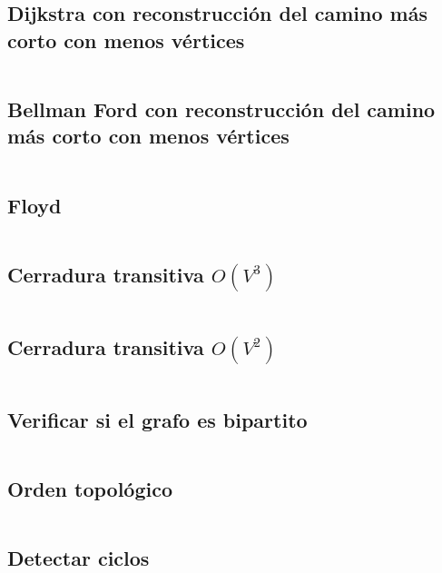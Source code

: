 \documentclass[11pt]{article}
\begin{document}
		\subsection{Dijkstra con reconstrucción del camino más corto con menos vértices}
		\inputminted[tabsize=2,breaklines,firstline=103,lastline=129,fontsize=\small]{c++}{graph.cpp}
		
		\subsection{Bellman Ford con reconstrucción del camino más corto con menos vértices}
		\inputminted[tabsize=2,breaklines,firstline=131,lastline=165,fontsize=\small]{c++}{graph.cpp}
		
		\subsection{Floyd}
		\inputminted[tabsize=2,breaklines,firstline=167,lastline=175,fontsize=\small]{c++}{graph.cpp}
		
		\subsection{Cerradura transitiva $O(V^3)$}
		\inputminted[tabsize=2,breaklines,firstline=177,lastline=184,fontsize=\small]{c++}{graph.cpp}
		
		\subsection{Cerradura transitiva $O(V^2)$}
		\inputminted[tabsize=2,breaklines,firstline=186,lastline=200,fontsize=\small]{c++}{graph.cpp}
		
		\subsection{Verificar si el grafo es bipartito}
		\inputminted[tabsize=2,breaklines,firstline=202,lastline=224,fontsize=\small]{c++}{graph.cpp}
		
		\subsection{Orden topológico}
		\inputminted[tabsize=2,breaklines,firstline=226,lastline=252,fontsize=\small]{c++}{graph.cpp}

		\subsection{Detectar ciclos}
		\inputminted[tabsize=2,breaklines,firstline=254,lastline=274,fontsize=\small]{c++}{graph.cpp}
		
\end{document}
